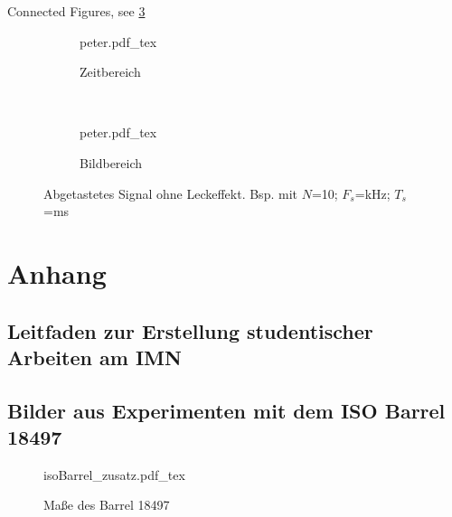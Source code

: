 \documentclass[12pt,
titlepage,
a4paper,
oneside,     %
openany,     %
listof=totoc,  %
numbers = noenddot, %
bibliography=totoc,    %
headsepline, %
]{scrbook} %
\begin{document}
Connected Figures, see \ref{fig:leck_toll}

\begin{figure}
	\centering
	\begin{subfigure}[b]{0.48\textwidth}
		\def\svgwidth{\columnwidth}
		{peter.pdf_tex}
		\caption{Zeitbereich}
		\label{leck_toll_t}
	\end{subfigure}
	~
	\begin{subfigure}[b]{0.48\textwidth}
		\def\svgwidth{\columnwidth}
		{peter.pdf_tex}
		\caption{Bildbereich}
		\label{leck_toll_f}
	\end{subfigure}
	\caption{Abgetastetes Signal ohne Leckeffekt. Bsp. mit $N$=10; $F_s$=\unit[1]{kHz}; $T_s$=\unit[10]{ms}}
	\label{fig:leck_toll}
\end{figure}


\printbibliography

\label{letzteSeite}
\appendix

\chapter{Anhang}
\label{cha_ausb}

\section{Leitfaden zur Erstellung studentischer Arbeiten am IMN}
\label{sec_Leitfaden}


\section{Bilder aus Experimenten mit dem ISO Barrel 18497}
\label{sec_bildiso}

\begin{figure}[h]
	\centering
	\def\svgwidth{0.9\columnwidth}
	{isoBarrel_zusatz.pdf_tex}
	\caption{Maße des Barrel 18497}
	\label{fig:isoBarrelExp}
\end{figure}
\end{document}
